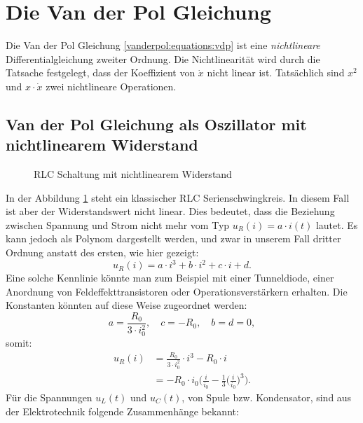 %
%
\section{Die Van der Pol Gleichung
\label{vanderpol:section:vdp_gleichung}}
Die Van der Pol Gleichung \eqref{vanderpol:equations:vdp} ist eine {\em nichtlineare} Differentialgleichung zweiter Ordnung. 
Die Nichtlinearität wird durch die Tatsache festgelegt, dass der Koeffizient von $\dot{x}$ nicht linear ist. Tatsächlich sind $x^{2}$ und $x \cdot \dot{x}$ zwei nichtlineare Operationen.

\subsection{Van der Pol Gleichung als Oszillator mit nichtlinearem Widerstand
\label{vanderpol:subsection:RLC}}
\begin{figure}
\centering
{} 
\caption{RLC Schaltung mit nichtlinearem Widerstand \label{vanderpol:figures:circuit}}
\end{figure}
In der Abbildung \ref{vanderpol:figures:circuit} steht ein klassischer RLC Serienschwingkreis. In diesem Fall ist aber der Widerstandswert nicht linear. Dies bedeutet, dass die Beziehung zwischen Spannung und Strom nicht mehr vom Typ $u_R(i) = a \cdot i(t)$ lautet. Es kann jedoch als Polynom dargestellt werden, und zwar in unserem Fall dritter Ordnung anstatt des ersten, wie hier gezeigt: 
\begin{equation}
u_R(i) = a \cdot i^3 + b \cdot i^2 + c \cdot i + d.
\end{equation}
Eine solche Kennlinie könnte man zum Beispiel mit einer Tunneldiode, einer Anordnung von Feldeffekttransistoren oder Operationsverstärkern erhalten. Die Konstanten könnten auf diese Weise zugeordnet werden:
\begin{equation*}
a = \frac{R_0}{3 \cdot i_0^2}, \quad c = -R_0, \quad b = d = 0,
\end{equation*}
somit:
\begin{align*}
u_R(i) &= \frac{R_0}{3 \cdot i_0^2} \cdot i^3 - R_0 \cdot i \\ 
&= -R_0 \cdot i_0 \biggl(\frac{i}{i_0} - \frac{1}{3} \biggl(\frac{i}{i_0} \biggr)^3 \biggr).  
\end{align*}
Für die Spannungen $u_{L}(t)$ und $u_{C}(t)$, von Spule bzw. Kondensator, sind aus der Elektrotechnik folgende Zusammenhänge bekannt:

